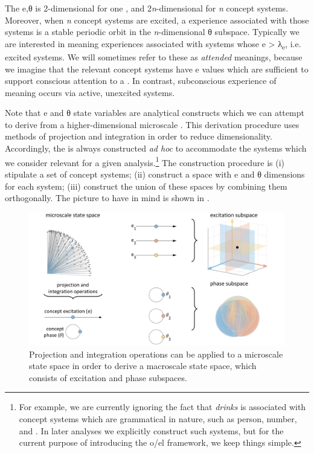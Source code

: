   The e,θ  is 2-di\-men\-sional for one , and 2\textit{n}-di\-men\-sional for \textit{n} concept systems. Moreover, when \textit{n} concept systems are excited, a  experience associated with those systems is a stable periodic orbit in the \textit{n}{}-di\-men\-sional θ subspace. Typically we are interested in meaning experiences associated with systems whose e > λ\textsubscript{e}, i.e. excited systems. We will sometimes refer to these as \textit{attended} meanings, because we imagine that the relevant concept systems have e values which are sufficient to support conscious attention to a . In contrast, subconscious experience of meaning occurs via active, unexcited systems.

  Note that e and θ state variables are analytical constructs which we can attempt to derive from a higher-di\-men\-sional microscale . This derivation procedure uses methods of projection and integration in order to reduce dimensionality. Accordingly, the  is always constructed \textit{ad hoc} to accommodate the systems which we consider relevant for a given analysis.\footnote{For example, we are currently ignoring the fact that \textit{drinks} is associated with concept systems which are grammatical in nature, such as person, number, and . In later analyses we explicitly construct such systems, but for the current purpose of introducing the o/el framework, we keep things simple.} The  construction procedure is (i) stipulate a set of concept systems; (ii) construct a space with e and θ dimensions for each system; (iii) construct the union of these spaces by combining them orthogonally. The picture to have in mind is shown in {}. 

  
\begin{figure}
\includegraphics[width=\textwidth]{figures/Tilsen-img14.png}
\caption{Projection and integration operations can be applied to a microscale state space in order to derive a macroscale state space, which consists of excitation and phase subspaces.}
\label{fig:2:7}
\end{figure}
 

